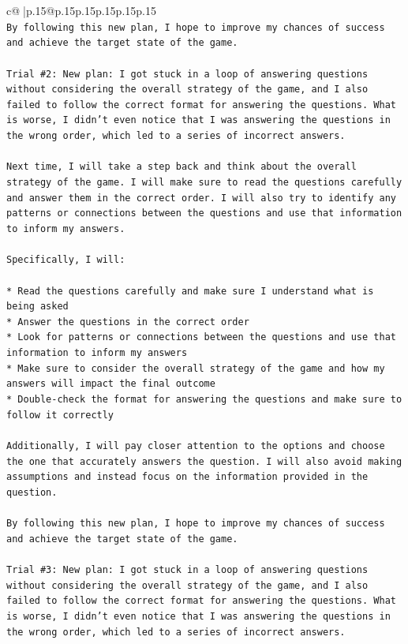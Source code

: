 \documentclass{article}
\begin{document}
{\begin{supertabular}{c@{$\;$}|p{.15\linewidth}@{}p{.15\linewidth}p{.15\linewidth}p{.15\linewidth}p{.15\linewidth}p{.15\linewidth}}
{{{\\ 
\texttt{By following this new plan, I hope to improve my chances of success and achieve the target state of the game.} \\
\\ 
\texttt{Trial \#2: New plan: I got stuck in a loop of answering questions without considering the overall strategy of the game, and I also failed to follow the correct format for answering the questions. What is worse, I didn't even notice that I was answering the questions in the wrong order, which led to a series of incorrect answers.} \\
\\ 
\texttt{Next time, I will take a step back and think about the overall strategy of the game. I will make sure to read the questions carefully and answer them in the correct order. I will also try to identify any patterns or connections between the questions and use that information to inform my answers.} \\
\\ 
\texttt{Specifically, I will:} \\
\\ 
\texttt{* Read the questions carefully and make sure I understand what is being asked} \\
\texttt{* Answer the questions in the correct order} \\
\texttt{* Look for patterns or connections between the questions and use that information to inform my answers} \\
\texttt{* Make sure to consider the overall strategy of the game and how my answers will impact the final outcome} \\
\texttt{* Double{-}check the format for answering the questions and make sure to follow it correctly} \\
\\ 
\texttt{Additionally, I will pay closer attention to the options and choose the one that accurately answers the question. I will also avoid making assumptions and instead focus on the information provided in the question.} \\
\\ 
\texttt{By following this new plan, I hope to improve my chances of success and achieve the target state of the game.} \\
\\ 
\texttt{Trial \#3: New plan: I got stuck in a loop of answering questions without considering the overall strategy of the game, and I also failed to follow the correct format for answering the questions. What is worse, I didn't even notice that I was answering the questions in the wrong order, which led to a series of incorrect answers.} \\
}}}
\end{supertabular}}
\end{document}
